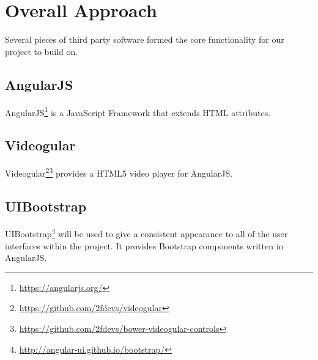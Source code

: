 \chapter{Overall Approach} 
\label{Chapter:Overall Approach}
Several pieces of third party software formed the core functionality for our project to build on. 
\section{AngularJS}
\label{Section:AngularJS}
AngularJS\footnote{\url{https://angularjs.org/}} is a JavaScript Framework that extends HTML attributes.
\section{Videogular}
\label{Section:Videogular}
Videogular\footnote{\url{https://github.com/2fdevs/videogular}}\footnote{\url{https://github.com/2fdevs/bower-videogular-controls}} provides a HTML5 video player for AngularJS.

\section{UIBootstrap}
\label{Section:UIBootstrap}
UIBootstrap\footnote{\url{http://angular-ui.github.io/bootstrap/}} will be used to give a consistent appearance to all of the user interfaces within the project. It provides Bootstrap components written in AngularJS.